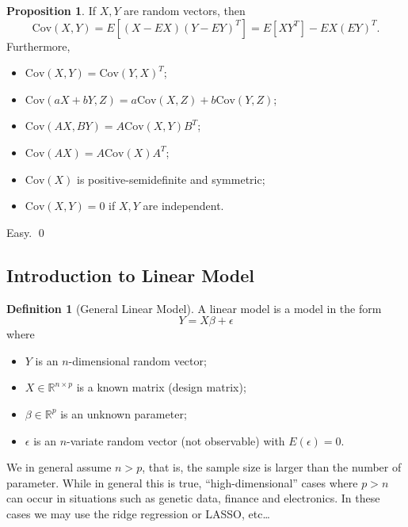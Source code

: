 \documentclass[
]{article}
\theoremstyle{definition}
\newtheorem{prop}{Proposition}
\theoremstyle{definition}
\newtheorem{definition}{Definition}[section]
\begin{document}
\begin{prop}
  If \(X, Y\) are random vectors, then 
  \[\text{Cov}(X, Y) = E[(X - EX)(Y - EY)^T] = E[XY^T] - EX (EY)^T.\]
  Furthermore, 
  \begin{itemize}
    \item \(\text{Cov}(X, Y) = \text{Cov}(Y, X)^T\);
    \item \(\text{Cov}(aX + bY, Z) = a\text{Cov}(X, Z) + b\text{Cov}(Y, Z)\);
    \item \(\text{Cov}(AX, BY) = A\text{Cov}(X, Y)B^T\);
    \item \(\text{Cov}(AX) = A\text{Cov}(X)A^T\);
    \item \(\text{Cov}(X)\) is positive-semidefinite and symmetric;
    \item \(\text{Cov}(X, Y) = 0\) if \(X, Y\) are independent.
  \end{itemize}
\end{prop}
\proof

Easy. \qed

\hypertarget{introduction-to-linear-model}{%
\subsection{Introduction to Linear
Model}\label{introduction-to-linear-model}}

\begin{definition}[General Linear Model]
  A linear model is a model in the form 
  \[Y = X \beta + \epsilon\]
  where 
  \begin{itemize}
    \item \(Y\) is an \(n\)-dimensional random vector;
    \item \(X \in \mathbb{R}^{n \times p}\) is a known matrix (design matrix);
    \item \(\beta \in \mathbb{R}^p\) is an unknown parameter;
    \item \(\epsilon\) is an \(n\)-variate random vector (not observable) with 
      \(E(\epsilon) = 0\).
  \end{itemize}
\end{definition}

We in general assume \(n > p\), that is, the sample size is larger than
the number of parameter. While in general this is true,
``high-dimensional'' cases where \(p > n\) can occur in situations such
as genetic data, finance and electronics. In these cases we may use the
ridge regression or LASSO, etc\ldots{}
\end{document}
